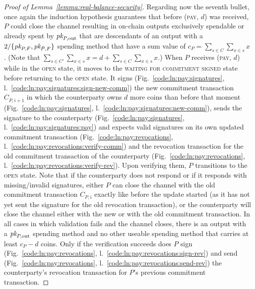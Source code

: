 \begin{proof}[Proof of Lemma~\ref{lemma:real-balance-security}]
  Regarding now the seventh bullet, once again the induction hypothesis guarantees
  that before (\textsc{pay}, $d$) was received, $P$ could close the channel
  resulting in on-chain outputs exclusively spendable or already spent by
  $\textit{pk}_{P, \mathrm{out}}$ that are descendants of an output with a $2/\{\textit{pk}_{P,
  F}, \textit{pk}_{\bar{P}, F}\}$ spending method that have a sum value of $c_P =
  \sum\limits_{s \in C} \sum\limits_{x \in s} x$. (Note that $\sum\limits_{s \in
  C'} \sum\limits_{x \in s} x = d + \sum\limits_{s \in C} \sum\limits_{x \in s}
  x$.) When $P$ receives (\textsc{pay}, $d$) while in the \textsc{open} state,
  it moves to the \textsc{waiting for commitment signed} state before returning
  to the \textsc{open} state. It signs (Fig.~\ref{code:ln:pay:signatures},
  l.~\ref{code:ln:pay:signatures:sign-new-comm}) the new commitment transaction
  $C_{\bar{P}, i+1}$ in which the counterparty owns $d$ more coins than before
  that moment (Fig.~\ref{code:ln:pay:signatures},
  l.~\ref{code:ln:pay:signatures:new-comm}), sends the signature to the
  counterparty (Fig.~\ref{code:ln:pay:signatures},
  l.~\ref{code:ln:pay:signatures:pay}) and expects valid signatures on its own
  updated commitment transaction (Fig.~\ref{code:ln:pay:revocations},
  l.~\ref{code:ln:pay:revocations:verify-comm}) and the revocation transaction
  for the old commitment transaction of the counterparty
  (Fig.~\ref{code:ln:pay:revocations},
  l.~\ref{code:ln:pay:revocations:verify-rev}). Upon verifying them, $P$
  transitions to the \textsc{open} state. Note that if the counterparty
  does not respond or if it responds with missing/invalid signatures, either $P$
  can close the channel with the old commitment transaction $C_{P, i}$ exactly
  like before the update started (as it has not yet sent the signature for the
  old revocation transaction), or the counterparty will close the channel either
  with the new or with the old commitment transaction. In all cases in which
  validation fails and the channel closes, there is an output with a $\textit{pk}_{P,
  \mathrm{out}}$ spending method and no other useable spending method that
  carries at least $c_P - d$ coins. Only if the verification succeeds does $P$
  sign (Fig.~\ref{code:ln:pay:revocations},
  l.~\ref{code:ln:pay:revocations:sign-rev}) and send
  (Fig.~\ref{code:ln:pay:revocations},
  l.~\ref{code:ln:pay:revocations:send-rev}) the counterparty's revocation
  transaction for $P$'s previous commitment transaction.


\end{proof}
